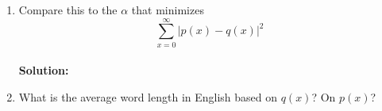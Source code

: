 \documentclass{assignment}
\begin{document}
\begin{enumerate}
\begin{enumerate}
  \item Compare this to the $\alpha$ that minimizes
    $$ \sum_{x=0}^\infty \left| p(x) -  q(x) \right|^2 $$ \\
    \textbf{Solution:} \\


  \item What is the average word length in English based on $q(x)$? On $p(x)$?
  \end{enumerate}
\end{enumerate}
\end{document}
